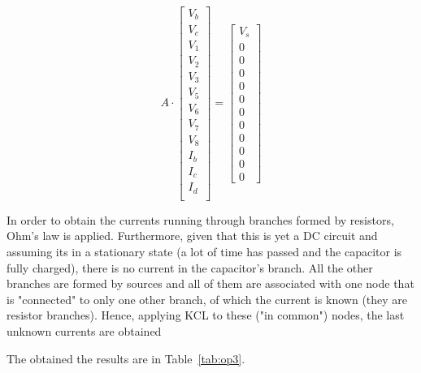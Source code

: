 \begin{equation}
    A \cdot
  \begin{bmatrix}
    V_b\\
    V_c\\
    V_1\\
    V_2\\
    V_3\\
    V_5\\
    V_6\\
    V_7\\
    V_8\\
    I_b\\
    I_c\\
    I_d\\
  \end{bmatrix}
    =
  \begin{bmatrix}
    V_s\\0\\0\\0\\0\\0\\0\\0\\0\\0\\0\\0
  \end{bmatrix}
  \label{eq:nodal_matrix_syst}
\end{equation}

In order to obtain the currents running through branches formed by resistors, Ohm's law is applied. Furthermore, given that this is yet a DC circuit and assuming its in a stationary state (a lot of time has passed and the capacitor is fully charged), there is no current in the capacitor's branch. All the other branches are formed by sources and all of them are associated with one node that is "connected" to only one other branch, of which the current is known (they are resistor branches). Hence, applying KCL to these ("in common") nodes, the last unknown currents are obtained

The obtained the results are in Table~\ref{tab:op3}.

\begin{comment}

\begin{table}[h]
  \centering
  \begin{tabular}{|l|r|}
    \hline    
    {\bf Name} & {\bf Value [A or V]} \\ \hline
    
  \end{tabular}
  \caption{Values for the components using the node method.}
  \label{tab:op3}
\end{table}

\end{comment}


